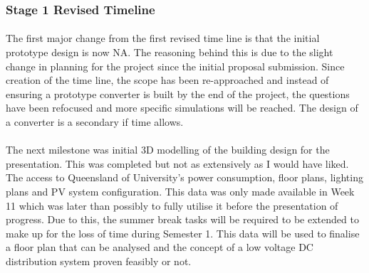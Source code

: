 \subsubsection{Stage 1 Revised Timeline}

\paragraph{}
The first major change from the first revised time line is that the initial prototype design is now NA. The reasoning behind this is due to the slight change in planning for the project since the initial proposal submission. Since creation of the time line, the scope has been re-approached and instead of ensuring a prototype converter is built by the end of the project, the questions have been refocused and more specific simulations will be reached. The design of a converter is a secondary if time allows. 

\paragraph{}
The next milestone was initial 3D modelling of the building design for the presentation. This was completed but not as extensively as I would have liked. The access to Queensland of University's power consumption, floor plans, lighting plans and PV system configuration. This data was only made available in Week 11 which was later than possibly to fully utilise it before the presentation of progress. Due to this, the summer break tasks will be required to be extended to make up for the loss of time during Semester 1. This data will be used to finalise a floor plan that can be analysed and the concept of a low voltage DC distribution system proven feasibly or not.  

